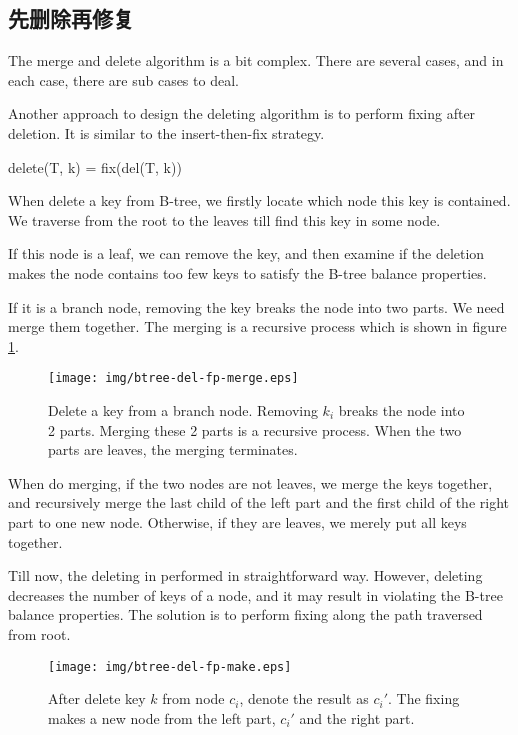 \documentclass[UTF8]{article}
\begin{document}
\subsection{先删除再修复}

The merge and delete algorithm is a bit complex.
There are several cases, and in each case, there are sub cases to deal.

Another approach to design the deleting algorithm is to perform fixing
after deletion. It is similar to the insert-then-fix strategy.

\be
delete(T, k) = fix(del(T, k))
\ee

When delete a key from B-tree, we firstly locate
which node this key is contained. We traverse
from the root to the leaves till find this key in some node.

If this node is a leaf, we can remove the key, and then
examine if the deletion makes the node contains too few keys to
satisfy the B-tree balance properties.

If it is a branch node, removing the key breaks the node into
two parts. We need merge them together. The merging is a recursive
process which is shown in figure \ref{fig:del-fp-merge}.

\begin{figure}[htbp]
  \centering
  \texttt{[image: img/btree-del-fp-merge.eps]}
  \caption{Delete a key from a branch node. Removing $k_i$ breaks
the node into 2 parts. Merging these 2 parts
is a recursive process. When the two parts are leaves, the merging
terminates.} \label{fig:del-fp-merge}
\end{figure}

When do merging, if the two nodes are not leaves, we merge the keys
together, and recursively merge the last child of the left part
and the first child of the right part to one new node. Otherwise,
if they are leaves, we merely put all keys together.

Till now, the deleting in performed in straightforward way. However, deleting
decreases the number of keys of a node, and it may result in
violating the B-tree balance properties. The solution is to perform
fixing along the path traversed from root.

\begin{figure}[htbp]
  \centering
  \texttt{[image: img/btree-del-fp-make.eps]}
  \caption{After delete key $k$ from node $c_i$, denote the result
as $c_i'$. The fixing makes a new node from the
left part, $c_i'$ and the right part.}
  \label{fig:del-fp-make}
\end{figure}
\end{document}
